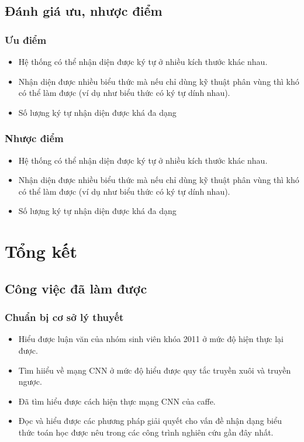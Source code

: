 \documentclass[a4paper,12pt]{article}
\begin{document}
	\subsection{Đánh giá ưu, nhược điểm}
	
	\subsubsection{Ưu điểm}
	
	\begin{itemize}
		\item Hệ thống có thể nhận diện được ký tự ở nhiều kích thước khác nhau.
		\item Nhận diện được nhiều biểu thức mà nếu chỉ dùng kỹ thuật phân vùng thì khó có thể làm được (ví dụ như biểu thức có ký tự dính nhau).
		\item Số lượng ký tự nhận diện được khá đa dạng
	\end{itemize}
	
	\subsubsection{Nhược điểm}
	
	\begin{itemize}
		\item Hệ thống có thể nhận diện được ký tự ở nhiều kích thước khác nhau.
		\item Nhận diện được nhiều biểu thức mà nếu chỉ dùng kỹ thuật phân vùng thì khó có thể làm được (ví dụ như biểu thức có ký tự dính nhau).
		\item Số lượng ký tự nhận diện được khá đa dạng
	\end{itemize}
	
	\section{Tổng kết}
	\subsection{Công việc đã làm được}
	\subsubsection{Chuẩn bị cơ sở lý thuyết}
	
	\begin{itemize}
		\item Hiểu được luận văn của nhóm sinh viên khóa 2011 ở mức độ hiện thực lại được.
		\item Tìm hiiểu về mạng CNN ở mức độ hiểu được quy tắc truyền xuôi và truyền ngược.
		\item Đã tìm hiểu được cách hiện thực mạng CNN của caffe.
		\item Đọc và hiểu được các phương pháp giải quyết cho vấn đề nhận dạng biểu thức toán học được nêu trong các công trình nghiên cứu gần đây nhất.
		
	\end{itemize} 
	
\end{document}
